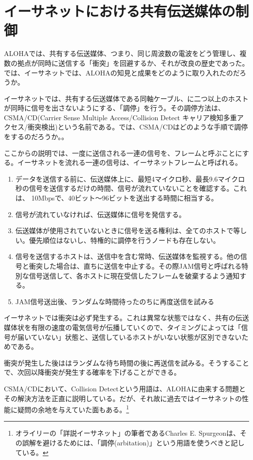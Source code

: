 \section{イーサネットにおける共有伝送媒体の制御}

ALOHAでは、共有する伝送媒体、つまり、同じ周波数の電波をどう管理し、複数の拠点が同時に送信する「衝突」を回避するか、それが改良の歴史であった。では、イーサネットでは、ALOHAの知見と成果をどのように取り入れたのだろうか。

イーサネットでは、共有する伝送媒体である同軸ケーブル、に二つ以上のホストが同時に信号を出さないようにする、「調停」を行う。その調停方法は、CSMA/CD(Carrier Sense Multiple Access/Collision Detect キャリア検知多重アクセス/衝突検出)という名前である。では、CSMA/CDはどのような手順で調停をするのだろうか。。

ここからの説明では、一度に送信される一連の信号を、フレームと呼ぶことにする。イーサネットを流れる一連の信号は、イーサネットフレームと呼ばれる。

\begin{enumerate}
	\item データを送信する前に、伝送媒体上に、最短4マイクロ秒、最長9.6マイクロ秒の信号を送信するだけの時間、信号が流れていないことを確認する。これは、 10Mbpsで、40ビット～96ビットを送出する時間に相当する。
	\item 信号が流れていなければ、伝送媒体に信号を発信する。
	\item 伝送媒体が使用されていないときに信号を送る権利は、全てのホストで等しい。優先順位はないし、特権的に調停を行うノードも存在しない。  \item 信号を送信するホストは、送信中を含む常時、伝送媒体を監視する。他の信号と衝突した場合は、直ちに送信を中止する。その際JAM信号と呼ばれる特別な信号送信して、各ホストに現在受信したフレームを破棄するよう通知する。
	\item JAM信号送出後、ランダムな時間待ったのちに再度送信を試みる
\end{enumerate}

イーサネットでは衝突は必ず発生する。これは異常な状態ではなく、共有の伝送媒体状を有限の速度の電気信号が伝播していくので、タイミングによっては「信号が届いていない」状態と、送信しているホストがいない状態が区別できないためである。

衝突が発生した後ははランダムな待ち時間の後に再送信を試みる。そうすることで、次回以降衝突が発生する確率を下げることができる。

CSMA/CDにおいて、Collision Detectという用語は、ALOHAに由来する問題とその解決方法を正直に説明している。だが、それ故に過去ではイーサネットの性能に疑問の余地を与えていた面もある。\footnote{オライリーの「詳説イーサネット」の筆者であるCharles E. Spurgeonは、その誤解を避けるためには、「調停(arbitation)」という用語を使うべきと記している。}



